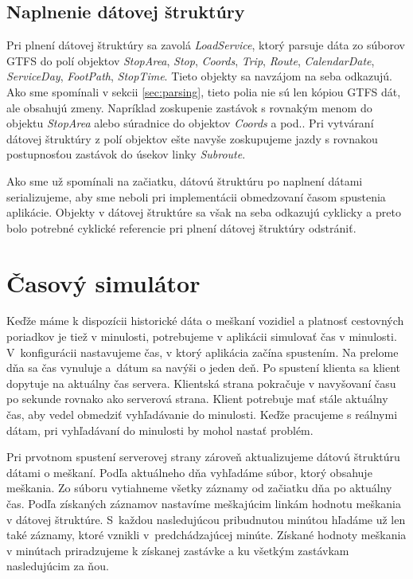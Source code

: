 \subsection{Naplnenie dátovej štruktúry}
Pri plnení dátovej štruktúry sa zavolá \textit{LoadService}, ktorý parsuje dáta zo súborov GTFS do polí objektov \textit{StopArea}, \textit{Stop}, \textit{Coords}, \textit{Trip}, \textit{Route}, \textit{CalendarDate}, \textit{ServiceDay}, \textit{FootPath}, \textit{StopTime}. Tieto objekty sa navzájom na seba odkazujú. Ako sme spomínali v sekcii \ref{sec:parsing}, tieto polia nie sú len kópiou GTFS dát, ale obsahujú zmeny. Napríklad zoskupenie zastávok s rovnakým menom do objektu \textit{StopArea} alebo súradnice do objektov \textit{Coords} a pod.. Pri vytváraní dátovej štruktúry z polí objektov ešte navyše zoskupujeme jazdy s rovnakou postupnosťou zastávok do úsekov linky \textit{Subroute}. 

Ako sme už spomínali na začiatku, dátovú štruktúru po naplnení dátami serializujeme, aby sme neboli pri implementácii obmedzovaní časom spustenia aplikácie. Objekty v dátovej štruktúre sa však na seba odkazujú cyklicky a preto bolo potrebné cyklické referencie pri plnení dátovej štruktúry odstrániť. 

\section{Časový simulátor}
Keďže máme k dispozícii historické dáta o meškaní vozidiel a platnosť cestovných poriadkov je tiež v minulosti, potrebujeme v aplikácii simulovať čas v minulosti. V~konfigurácii nastavujeme čas, v ktorý aplikácia začína spustením. Na prelome dňa sa čas vynuluje a~dátum sa navýši o jeden deň. 
Po spustení klienta sa klient dopytuje na aktuálny čas servera. Klientská strana pokračuje v navyšovaní času po sekunde rovnako ako serverová strana. Klient potrebuje mať stále aktuálny čas, aby vedel obmedziť vyhľadávanie do minulosti. Keďže pracujeme s reálnymi dátam, pri vyhľadávaní do minulosti by mohol nastať problém. 

Pri prvotnom spustení serverovej strany zároveň aktualizujeme dátovú štruktúru dátami o meškaní. Podľa aktuálneho dňa vyhľadáme súbor, ktorý obsahuje meškania. Zo súboru vytiahneme všetky záznamy od začiatku dňa po aktuálny čas. Podľa získaných záznamov nastavíme meškajúcim linkám hodnotu meškania v dátovej štruktúre. S~každou nasledujúcou pribudnutou minútou hľadáme už len také záznamy, ktoré vznikli v~predchádzajúcej minúte. 
Získané hodnoty meškania v minútach priradzujeme k získanej zastávke a ku všetkým zastávkam nasledujúcim za ňou. 

